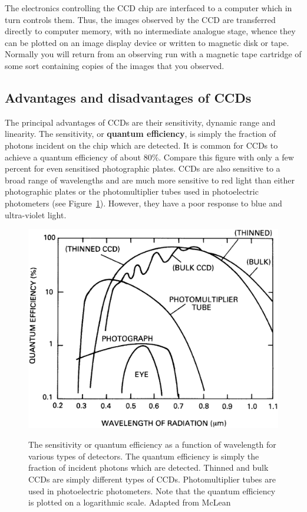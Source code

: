\documentclass[twoside,11pt]{article}
\begin{document}
The electronics controlling the CCD chip are interfaced to a computer
which in turn controls them.  Thus, the images observed by the CCD are
transferred directly to computer memory, with no intermediate analogue
stage, whence they can be plotted on an image display device or written
to magnetic disk or tape.  Normally you will return from an observing
run with a magnetic tape cartridge of some sort containing copies of the
images that you observed.

\subsection{\label{ADDIS}Advantages and disadvantages of CCDs}

The principal advantages of CCDs are their sensitivity, dynamic range
and linearity.  The sensitivity, or {\bf quantum efficiency}, is simply
the fraction of photons incident on the chip which are detected.
It is common for CCDs to achieve a quantum efficiency of about 80\%.
Compare this figure with only a few percent for even sensitised
photographic plates.  CCDs are also sensitive to a broad range of
wavelengths and are much more sensitive to red light than either
photographic plates or the photomultiplier tubes used in photoelectric
photometers (see Figure~\ref{SENSITIVITY}).  However, they have a poor
response to blue and ultra-violet light.

\begin{figure}[htbp]
   \centering
   \includegraphics[totalheight=3in]{sc5_sensitivity.ps}
   \begin{quote}
   \caption[The wavelength sensitivity of various types of detectors]{The
    sensitivity or quantum efficiency as a function of wavelength for various
    types of detectors.  The quantum efficiency is simply the fraction of
    incident photons which are detected.  Thinned and bulk CCDs are simply
    different types of CCDs.  Photomultiplier tubes are used in
    photoelectric photometers.  Note that the quantum efficiency is plotted
    on a logarithmic scale.  Adapted from McLean\cite{MCLEAN89, MCLEAN97}
   \label{SENSITIVITY} }
   \end{quote}
\end{figure}
\end{document}
